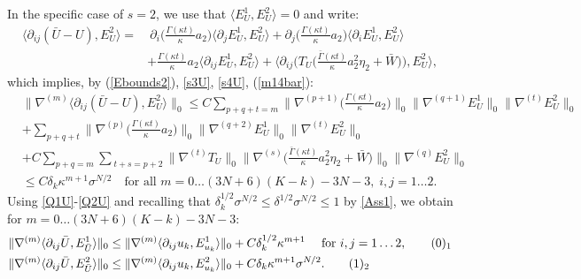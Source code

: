 \documentclass[reqno,twoside,11pt]{amsart}
\numberwithin{equation}{section}
\theoremstyle{plain}
\theoremstyle{definition}
\begin{document}
In the specific case of $s=2$, we use that $\langle E^1_{U}, E^2_{U}\rangle=0$ and write:
\begin{equation*}
\begin{split}
\langle\partial_{ij}(\bar U-U), E^2_{U} \rangle = & ~\partial_i
\Big(\frac{\Gamma(\kappa t)}{\kappa } a_2\Big)\langle \partial_jE^1_{U},
E^2_{U}\rangle + \partial_j\Big(\frac{\Gamma(\kappa t)}{\kappa} a_2\Big)\langle \partial_iE^1_{U},
E^2_{U}\rangle \\ & + \frac{\Gamma(\kappa t)}{\kappa} a_2\langle \partial_{ij}E^1_{U},
E^2_{U}\rangle + \Big\langle \partial_{ij}\Big(T_{U}\Big(\frac{\bar\Gamma(\kappa 
 t)}{\kappa}a_2^2\eta_2+\bar W\Big)\Big), E^2_{U}\Big\rangle,
\end{split}
\end{equation*}
which implies, by (\ref{Ebounds2}), \ref{s3U}, \ref{s4U}, (\ref{m14bar}):
\begin{equation*}
\begin{split}
& \|\nabla^{(m)}\langle\partial_{ij}(\bar U-U), E^2_{U}\rangle\|_0 
\leq  C\sum_{p+q+t=m}\big\|\nabla^{(p+1)}\Big (\frac{\Gamma(\kappa
  t)}{\kappa} a_2\Big)\big\|_0 \|\nabla^{(q+1)}E^1_{U}\|_0\|\nabla^{(t)}E^2_{U}\|_0
\\ & +\sum_{p+q+t} \big\|\nabla^{(p)}\Big (\frac{\Gamma(\kappa
  t)}{\kappa} a_2\Big)\big\|_0 \|\nabla^{(q+2)}E^1_{U}\|_0\|\nabla^{(t)}E^2_{U}\|_0
\\ & + C\sum_{p+q=m}\sum_{~t+s=p+2}\|\nabla^{(t)}T_{U}\|_0
\big\|\nabla^{(s)}\Big (\frac{\bar\Gamma(\kappa t)}{\kappa} a_2^2\eta_2 +
\bar W\Big)\big\|_0\|\nabla^{(q)}E^2_{U}\|_0
\\ & \leq  C\delta_k\kappa^{m+1} \sigma^{N/2}\quad\mbox{for all }
m=0\ldots (3N+6)(K-k)-3N-3, \; i,j=1\ldots 2.
\end{split}
\end{equation*}
Using \ref{Q1U}-\ref{Q2U} and recalling that
$\delta_k^{1/2}\sigma^{N/2}\leq \delta^{1/2}\sigma^{N/2}\leq 1$ by
\ref{Ass1}, we obtain for $m=0\ldots (3N+6)(K-k)-3N-3$:
\begin{align*}
&  \|\nabla^{(m)}\langle \partial_{ij}\bar U, E^1_{\bar U}\rangle\|_0  \leq
\|\nabla^{(m)}\langle \partial_{ij}u_k, E^1_{u_k}\rangle\|_0 +
C\delta_k^{1/2}\kappa^{m+1} \quad\mbox{ for } i,j=1\ldots 2,
\tag*{(\theequation)$_1$}\refstepcounter{equation} \label{Q1Ud} \\
& \|\nabla^{(m)}\langle \partial_{ij}\bar U, E^2_{\bar U}\rangle\|_0 \leq
\|\nabla^{(m)}\langle \partial_{ij}u_k, E^2_{u_k}\rangle\|_0 + C\delta_k \kappa^{m+1}\sigma^{N/2}.
\tag*{(\theequation)$_2$} \label{Q2Ud} 
\end{align*}
\end{document}
